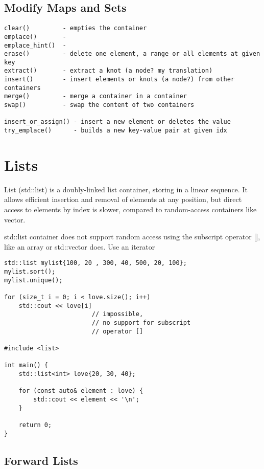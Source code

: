\subsection{Modify Maps and Sets}

\begin{verbatim}
clear()         - empties the container
emplace()       -    
emplace_hint()  -  
erase()         - delete one element, a range or all elements at given key
extract()       - extract a knot (a node? my translation)
insert()        - insert elements or knots (a node?) from other containers
merge()         - merge a container in a container 
swap()          - swap the content of two containers 

insert_or_assign() - insert a new element or deletes the value
try_emplace()      - builds a new key-value pair at given idx
\end{verbatim}

\section{Lists}

List (std::list) is a doubly-linked list container, storing in a linear sequence. 
It allows efficient insertion and removal of elements at any position, 
but direct access to elements by index is slower,
compared to random-access containers like vector.

std::list container does not support random access using the subscript operator [],
like an array or std::vector does. Use an iterator

\begin{verbatim}
std::list mylist{100, 20 , 300, 40, 500, 20, 100};
mylist.sort();
mylist.unique();

for (size_t i = 0; i < love.size(); i++)
    std::cout << love[i] 
                        // impossible, 
                        // no support for subscript
                        // operator []

#include <list>

int main() {
    std::list<int> love{20, 30, 40};

    for (const auto& element : love) {
        std::cout << element << '\n';
    }

    return 0;
}
\end{verbatim}

\subsection{Forward Lists}


